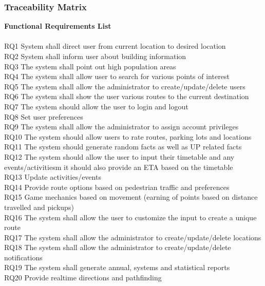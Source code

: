 \documentclass{article}
\begin{document}
		\subsubsection{Traceability Matrix}	
		{
			\noindent\textbf{Functional Requirements List}\\\\
			RQ1 System shall direct user from current location to desired location\\
			RQ2 System shall inform user about building information\\
			RQ3 The system shall point out high population areas\\
			RQ4 The system shall allow user to search for various points of interest\\
			RQ5 The system shall allow the administrator to create/update/delete users\\
			RQ6 The system shall show the user various routes to the current destination\\
			RQ7 The system should allow the user to login and logout\\
			RQ8 Set user preferences\\
			RQ9 The system shall allow the administrator to assign account privileges\\
			RQ10 The system should allow users to rate routes, parking lots and locations\\
			RQ11 The system should generate random facts as well as UP related facts\\
			RQ12 The system should allow the user to input their timetable and any events/activitiesm it should also provide an ETA based on the timetable\\
			RQ13 Update activities/events\\
			RQ14 Provide route options based on pedestrian traffic and preferences\\
			RQ15 Game mechanics based on movement (earning of points based on distance travelled and pickups)\\
			RQ16 The system shall allow the user to customize the input to create a unique route\\
			RQ17 The system shall allow the administrator to create/update/delete locations\\
			RQ18 The system shall allow the administrator to create/update/delete notifications\\
			RQ19 The system shall generate annual, systems and statistical reports\\
			RQ20 Provide realtime directions and pathfinding\\
}
\end{document}
